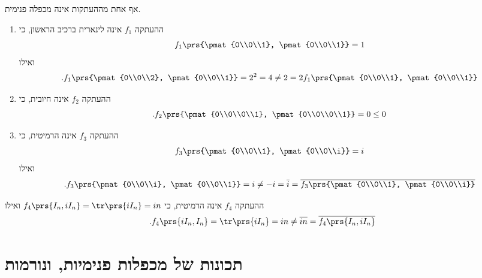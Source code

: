 \documentclass[a4paper,10pt,twoside,openany]{book}
\begin{document}
\begin{solution}
אף אחת מההעתקות אינה מכפלה פנימית.
\begin{enumerate}
\item
ההעתקה
$f_1$
אינה לינארית ברכיב הראשון, כי
\[f_1\prs{\pmat{0\\0\\1}, \pmat{0\\0\\1}} = 1\]
ואילו
\[\text{.} f_1\prs{\pmat{0\\0\\2}, \pmat{0\\0\\1}} = 2^2 = 4 \neq 2 = 2 f_1\prs{\pmat{0\\0\\1}, \pmat{0\\0\\1}}\]

\item
ההעתקה
$f_2$
אינה חיובית, כי
\[\text{.} f_2\prs{\pmat{0\\0\\0\\1}, \pmat{0\\0\\0\\1}} = 0 \leq 0\]

\item
ההעתקה
$f_3$
אינה הרמיטית, כי
\[f_3\prs{\pmat{0\\0\\1}, \pmat{0\\0\\i}} = i\]
ואילו
\[\text{.} f_3\prs{\pmat{0\\0\\i}, \pmat{0\\0\\1}} = i \neq -i = \bar{i} = \overline{f_3\prs{\pmat{0\\0\\1}, \pmat{0\\0\\i}}}\]
\end{enumerate}

\item
ההעתקה
$f_4$
אינה הרמיטית, כי
$f_4\prs{I_n, iI_n} = \tr\prs{iI_n} = in$
ואילו
\[\text{.} f_4\prs{i I_n, I_n} = \tr\prs{iI_n} =in \neq \overline{in} = \overline{f_4\prs{I_n, iI_n}}\]
\end{solution}

\section{תכונות של מכפלות פנימיות, ונורמות}
\end{document}

